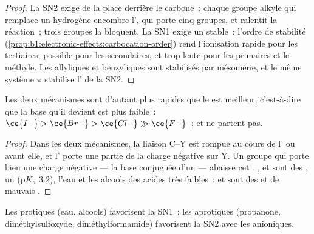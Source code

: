 \begin{proof}
La SN2 exige de la place derrière le carbone~: chaque groupe alkyle qui
remplace un hydrogène encombre l', qui porte cinq
groupes, et ralentit la réaction~; trois groupes la bloquent. La SN1
exige un  stable~: l'ordre de stabilité
(\cref{prop:b1:electronic-effects:carbocation-order}) rend l'ionisation
rapide pour les  tertiaires, possible pour les secondaires,
et trop lente pour les primaires et le méthyle. Les 
allyliques et benzyliques sont stabilisés par mésomérie, et le même
système $\pi$ stabilise l' de la SN2.
\end{proof}

\begin{proposition}\label{prop:b1:nucleophilic-substitution:leaving-group}
Les deux mécanismes sont d'autant plus rapides que le  est
meilleur, c'est-à-dire que la base qu'il devient est plus faible~:
$\ce{I-} > \ce{Br-} > \ce{Cl-} \gg \ce{F-}$~;  et  ne
partent pas.
\end{proposition}

\begin{proof}
Dans les deux mécanismes, la liaison C--Y est rompue au cours de l' ou avant elle, et l' porte
une partie de la charge négative sur Y. Un groupe qui porte bien une
charge négative --- la base conjuguée d'un  --- abaisse cet
. ,  et  sont des ,
 un  ($\mathrm{p}K_a$ 3.2), l'eau et les alcools des
acides très faibles~:  et  sont des  et de
mauvais .
\end{proof}

\begin{proposition}[Le solvant]\label{prop:b1:nucleophilic-substitution:solvent}
Les  protiques (eau, alcools) favorisent la SN1~; les
 aprotiques (propanone, diméthylsulfoxyde,
diméthylformamide) favorisent la SN2 avec les  anioniques.
\end{proposition}

